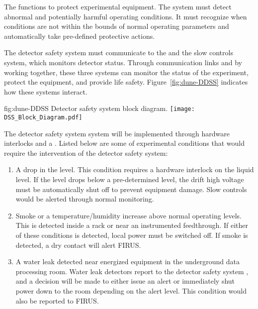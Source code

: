The  functions to protect
experimental equipment.  The system must detect abnormal and
potentially harmful operating conditions.  It must recognize when
conditions are not within the bounds of normal operating parameters
and automatically take pre-defined protective actions.


The detector safety system must communicate to the \surf {} 
and the  slow controls
system, which monitors detector status.  Through communication
links and by working together, these three systems can monitor the status of the experiment, protect the equipment,
and provide life safety. Figure~\ref{fig:dune-DDSS} indicates how
these systems interact.
\begin{dunefigure}{fig:dune-DDSS}
  {Detector safety system block diagram.}
  \texttt{[image: DSS\_Block\_Diagram.pdf]}
\end{dunefigure}


The detector safety system system will be implemented through hardware interlocks and a .  Listed below are some of  experimental conditions that would
require the intervention of the detector safety system:
\begin{enumerate}
 \item A drop in the  level.  This condition requires a hardware
   interlock on the liquid level.  If the level drops below a
   pre-determined level, the drift high voltage must be automatically 
   shut off to prevent equipment damage.  Slow controls would be
   alerted through normal monitoring.
 \item Smoke or a temperature/humidity increase above normal operating
   levels. This is detected inside a rack or near an instrumented
   feedthrough.  If either of these conditions is detected, local
   power must be switched off. If smoke is detected, a
   dry contact will alert FIRUS.
 \item A water leak detected near energized equipment in the 
   underground data processing room.  Water leak detectors 
   report to the detector safety system , and a decision will be made to either
   issue an alert or immediately shut power down to the room depending
   on the alert level.  This condition would also be reported
   to FIRUS.
\end{enumerate}
